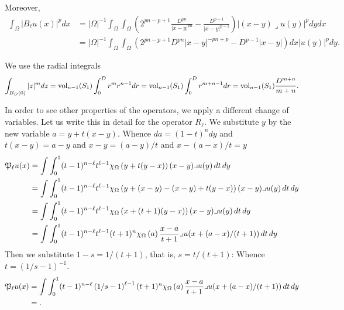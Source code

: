\documentclass[a4paper]{article}
\begin{document}
Moreover,  
\begin{align*}
    \int_{\Omega} \left| B_{\ell} u(x) \right|^{p} dx
    &=
    |\Omega|^{-1} 
    \int_{\Omega} 
    \int_{\Omega} 
    \left( 2^{pn-p+1} \frac{D^{pn}}{|x-y|^{pn}} - \frac{D^{p-1}}{|x-y|^{p-1}} \right)
    \left| (x-y)\lrcorner u(y) \right|^{p} 
    dy dx
    \\&=
    |\Omega|^{-1} 
    \int_{\Omega} 
    \int_{\Omega} \left( 2^{pn-p+1} D^{pn} |x-y|^{-pn+p} - D^{p-1} |x-y| \right) dx
    \left| u(y) \right|^{p} 
    dy
    .
\end{align*}






We use the radial integrals
\begin{align*}
    \int_{B_D(0)} |z|^{m} dz
    =
    \operatorname{vol}_{n-1}(S_1) \int_0^D r^{m} r^{n-1} dr
    =
    \operatorname{vol}_{n-1}(S_1) \int_0^D r^{m+n-1} dr
    =
    \operatorname{vol}_{n-1}(S_1) \frac{D^{m+n}}{m+n}
    .
\end{align*}







In order to see other properties of the operators, we apply a different change of variables. 
Let us write this in detail for the operator $R_{\ell}$. 
We substitute $y$ by the new variable $a=y+t(x-y)$.
Whence $da = (1-t)^n dy$ and $t(x-y) = a-y$ and $x-y = (a-y)/t$ and $x - (a-x)/t = y$
\begin{align*}
    {\mathfrak P}_{\ell} u(x) 
    &= 
    \int \int_{0}^{1} (t-1)^{n-\ell}t^{\ell-1} 
    \chi_{\Omega}\left(y+t(y-x)\right) 
    (x-y)\lrcorner u(y) \,dt\,dy 
    \\&= 
    \int \int_{0}^{1} (t-1)^{n-\ell}t^{\ell-1} 
    \chi_{\Omega}\left(y+(x-y)-(x-y)+t(y-x)\right) 
    (x-y)\lrcorner u(y) \,dt\,dy 
    \\&= 
    \int \int_{0}^{1} (t-1)^{n-\ell}t^{\ell-1} 
    \chi_{\Omega}\left(x+(t+1)(y-x)\right) 
    (x-y)\lrcorner u(y) \,dt\,dy 
    \\
    &= 
    \int \int_{0}^{1} (t-1)^{n-\ell}t^{\ell-1} (t+1)^{n}
    \chi_{\Omega}\left(a\right) 
    \frac{ x-a }{t+1}\lrcorner u( x + (a-x)/(t+1) ) \,dt\,dy 
\end{align*}
Then we substitute $1-s = 1/(t+1)$, that is, $s = t/(t+1)$:
Whence $t = \left( 1/s-1 \right)^{-1}$.
\begin{align*}
    {\mathfrak P}_{\ell} u(x) 
    &= 
    \int \int_{0}^{1} (t-1)^{n-\ell} \left( 1/s-1 \right)^{\ell-1} (t+1)^{n}
    \chi_{\Omega}\left(a\right) 
    \frac{ x-a }{t+1}\lrcorner u( x + (a-x)/(t+1) ) \,dt\,dy 
    \\
    &= 
    .
\end{align*}
\end{document}

